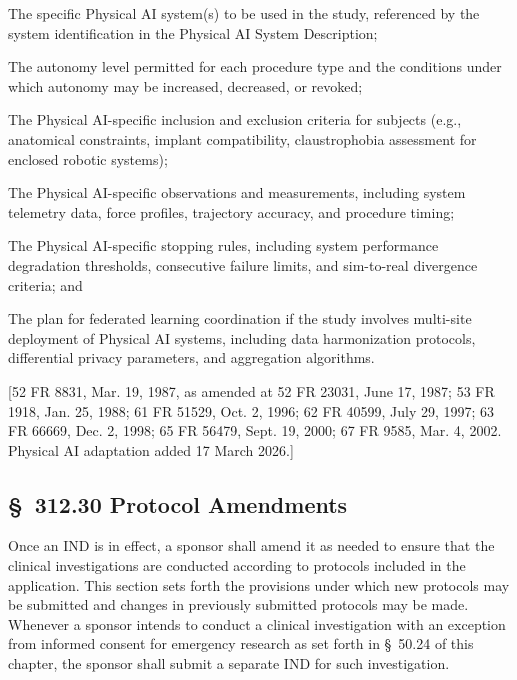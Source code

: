 \documentclass[11pt]{article}
\begin{document}
\begin{description}[leftmargin=0.8cm,style=sameline]
\item[(i)] The specific Physical AI system(s) to be used in the study, referenced by the system identification in the Physical AI System Description;
\item[(ii)] The autonomy level permitted for each procedure type and the conditions under which autonomy may be increased, decreased, or revoked;
\item[(iii)] The Physical AI-specific inclusion and exclusion criteria for subjects (e.g., anatomical constraints, implant compatibility, claustrophobia assessment for enclosed robotic systems);
\item[(iv)] The Physical AI-specific observations and measurements, including system telemetry data, force profiles, trajectory accuracy, and procedure timing;
\item[(v)] The Physical AI-specific stopping rules, including system performance degradation thresholds, consecutive failure limits, and sim-to-real divergence criteria; and
\item[(vi)] The plan for federated learning coordination if the study involves multi-site deployment of Physical AI systems, including data harmonization protocols, differential privacy parameters, and aggregation algorithms.
\end{description}

[52 FR 8831, Mar. 19, 1987, as amended at 52 FR 23031, June 17, 1987; 53 FR 1918, Jan. 25, 1988; 61 FR 51529, Oct. 2, 1996; 62 FR 40599, July 29, 1997; 63 FR 66669, Dec. 2, 1998; 65 FR 56479, Sept. 19, 2000; 67 FR 9585, Mar. 4, 2002. Physical AI adaptation added 17 March 2026.]

\subsection{\S~312.30 Protocol Amendments}

Once an IND is in effect, a sponsor shall amend it as needed to ensure that the clinical investigations are conducted according to protocols included in the application. This section sets forth the provisions under which new protocols may be submitted and changes in previously submitted protocols may be made. Whenever a sponsor intends to conduct a clinical investigation with an exception from informed consent for emergency research as set forth in \S~50.24 of this chapter, the sponsor shall submit a separate IND for such investigation.
\end{document}
